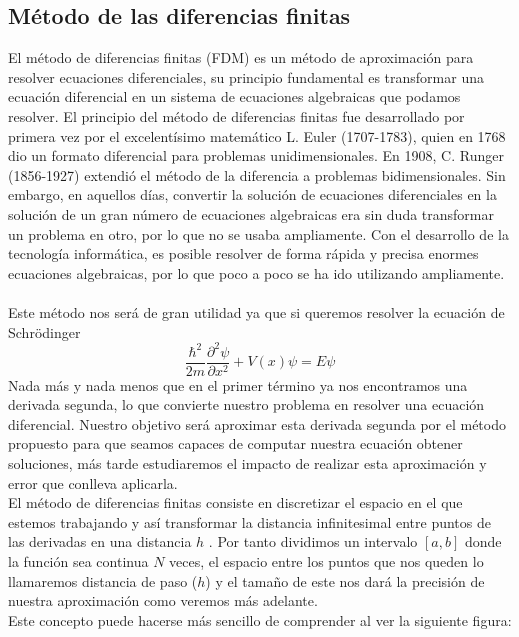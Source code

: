 \documentclass[12pt]{article}
\begin{document}
\subsection{Método de las diferencias finitas}
El método de diferencias finitas (FDM) es un método de aproximación para resolver ecuaciones diferenciales, su principio fundamental es transformar una ecuación diferencial en un sistema de ecuaciones algebraicas que podamos resolver. El principio del método de diferencias finitas fue desarrollado por primera vez por el excelentísimo matemático L. Euler (1707-1783), quien en 1768 dio un formato diferencial para problemas unidimensionales. En 1908, C. Runger (1856-1927) extendió el método de la diferencia a problemas bidimensionales. Sin embargo, en aquellos días, convertir la solución de ecuaciones diferenciales en la solución de un gran número de ecuaciones algebraicas era sin duda transformar un problema en otro, por lo que no se usaba ampliamente. Con el desarrollo de la tecnología informática, es posible resolver de forma rápida y precisa enormes ecuaciones algebraicas, por lo que poco a poco se ha ido utilizando ampliamente. 
\\
\\
Este método nos será de gran utilidad ya que si queremos resolver la ecuación de Schrödinger
\begin{equation}\label{eq2}
\frac{\hbar^2}{2m} \frac{\partial^2\psi}{\partial x^2} + V(x)\psi = E \psi
\end{equation}
Nada más y nada menos que en el primer término ya nos encontramos una derivada segunda, lo que convierte nuestro problema en resolver una ecuación diferencial.
Nuestro objetivo será aproximar esta derivada segunda  por el método propuesto para que seamos capaces de computar nuestra ecuación obtener soluciones,
más tarde estudiaremos el impacto de realizar esta aproximación y error que conlleva aplicarla.\\

El método de diferencias finitas consiste en discretizar el espacio en el que estemos trabajando 
y así transformar la distancia infinitesimal entre puntos de las derivadas en una distancia $h$ 
. Por tanto dividimos un intervalo $[a,b]$ donde la función sea continua $N$ veces,
el espacio entre los puntos que nos queden lo llamaremos distancia de paso ($h$) y el tamaño de este nos dará la precisión de nuestra aproximación como veremos más adelante.\\

Este concepto puede hacerse más sencillo de comprender al ver la siguiente figura:
\end{document}
